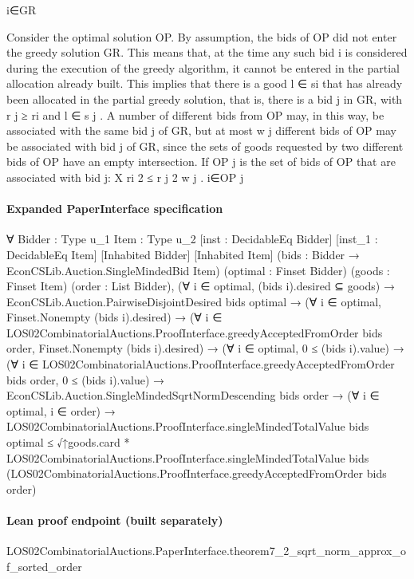 \documentclass[10pt]{article}
\begin{document}
\begin{ReviewVerbatim}
i∈GR

Consider the optimal solution OP. By assumption, the bids of OP did not enter
the greedy solution GR. This means that, at the time any such bid i is considered
during the execution of the greedy algorithm, it cannot be entered in the partial
allocation already built. This implies that there is a good l ∈ si that has already
been allocated in the partial greedy solution, that is, there is a bid j in GR, with
r j ≥ ri and l ∈ s j .
A number of different bids from OP may, in this way, be associated with the
same bid j of GR, but at most w j different bids of OP may be associated with bid j
of GR, since the sets of goods requested by two different bids of OP have an empty
intersection. If OP j is the set of bids of OP that are associated with bid j:
X
ri 2 ≤ r j 2 w j .
i∈OP j
\end{ReviewVerbatim}


\paragraph{Expanded PaperInterface specification}
\begin{ReviewVerbatim}
∀ {Bidder : Type u_1} {Item : Type u_2} [inst : DecidableEq Bidder] [inst_1 : DecidableEq Item] [Inhabited Bidder]
  [Inhabited Item] (bids : Bidder → EconCSLib.Auction.SingleMindedBid Item) (optimal : Finset Bidder)
  (goods : Finset Item) (order : List Bidder),
  (∀ i ∈ optimal, (bids i).desired ⊆ goods) →
    EconCSLib.Auction.PairwiseDisjointDesired bids optimal →
      (∀ i ∈ optimal, Finset.Nonempty (bids i).desired) →
        (∀ i ∈ LOS02CombinatorialAuctions.ProofInterface.greedyAcceptedFromOrder bids order,
            Finset.Nonempty (bids i).desired) →
          (∀ i ∈ optimal, 0 ≤ (bids i).value) →
            (∀ i ∈ LOS02CombinatorialAuctions.ProofInterface.greedyAcceptedFromOrder bids order, 0 ≤ (bids i).value) →
              EconCSLib.Auction.SingleMindedSqrtNormDescending bids order →
                (∀ i ∈ optimal, i ∈ order) →
                  LOS02CombinatorialAuctions.ProofInterface.singleMindedTotalValue bids optimal ≤
                    √↑goods.card *
                      LOS02CombinatorialAuctions.ProofInterface.singleMindedTotalValue bids
                        (LOS02CombinatorialAuctions.ProofInterface.greedyAcceptedFromOrder bids order)
\end{ReviewVerbatim}

\paragraph{Lean proof endpoint (built separately)}\begin{ReviewVerbatim}
LOS02CombinatorialAuctions.PaperInterface.theorem7_2_sqrt_norm_approx_of_sorted_order
\end{ReviewVerbatim}
\end{document}
